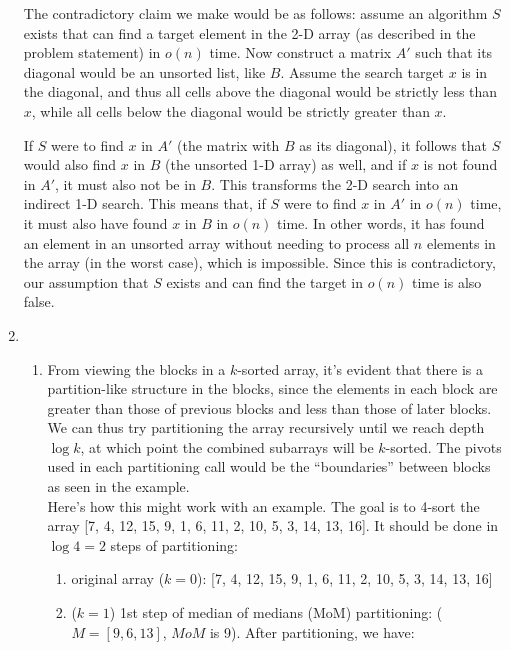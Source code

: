 \documentclass[12pt]{article}
\begin{document}
\begin{enumerate}
    The contradictory claim we make would be as follows: assume an algorithm $S$ exists that can find a target element in the 
    2-D array (as described in the problem statement) in $o(n)$ time. Now construct a matrix $A'$ such that its diagonal would 
    be an unsorted list, like $B$. Assume the search target $x$ is in the diagonal, and thus all cells above the diagonal 
    would be strictly less than $x$, while all cells below the diagonal would be strictly greater than $x$.

    If $S$ were to find $x$ in $A'$ (the matrix with $B$ as its diagonal), it follows that $S$ would also find $x$ in $B$ 
    (the unsorted 1-D array) as well, and if $x$ is not found in $A'$, it must also not be in $B$. This transforms the 2-D 
    search into an indirect 1-D search. This means that, if $S$ were to find $x$ in $A'$ in $o(n)$ time, it must also have found 
    $x$ in $B$ in $o(n)$ time. In other words, it has found an element in an unsorted array without needing to process all $n$ elements 
    in the array (in the worst case), which is impossible. Since this is contradictory, our assumption that $S$ exists and can find the target in 
    $o(n)$ time is also false.
    
    \item 
    \begin{enumerate}
        \item From viewing the blocks in a $k$-sorted array, it's evident that there is a partition-like structure in the blocks, 
        since the elements in each block are greater than those of previous blocks and less than those of later blocks. We can 
        thus try partitioning the array recursively until we reach depth $\log k$, at which point the combined subarrays will be 
        $k$-sorted. The pivots used in each partitioning call would be the ``boundaries'' between blocks as seen in the 
        example.\\

        Here's how this might work with an example. The goal is to 4-sort the array [7, 4, 12, 15, 9, 1, 6, 11, 2, 10, 5, 3, 14, 13, 16]. 
        It should be done in $\log 4 = 2$ steps of partitioning:

        \begin{enumerate}
            \item original array ($k = 0$): [7, 4, 12, 15, 9, 1, 6, 11, 2, 10, 5, 3, 14, 13, 16]
            \item ($k = 1$) 1st step of median of medians (MoM) partitioning: ($M = [9, 6, 13]$, $MoM$ is 9). After 
            partitioning, we have:
            

\end{enumerate}
\end{enumerate}
\end{enumerate}
\end{document}
